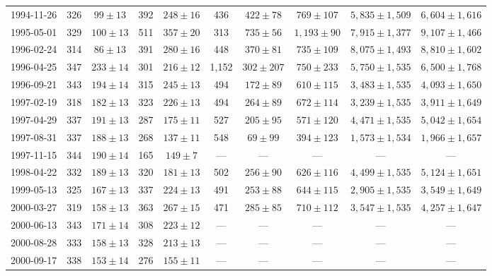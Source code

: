 \begin{landscape}
\begin{longtable}{cccccccccc}
{1994-11-26} & 326 & {$99  \pm  13$} & 392 & {$248 \pm 16$} & 436 & {$422 \pm 78$} & {$769 \pm 107$} & {$5,835 \pm 1,509$} & {$6,604 \pm 1,616$} \\
{1995-05-01} & 329 & {$100  \pm  13$} & 511 & {$357 \pm 20$} & 313 & {$735 \pm 56$} & {$1,193 \pm 90$} & {$7,915 \pm 1,377$} & {$9,107 \pm 1,466$} \\
{1996-02-24} & 314 & {$86  \pm  13$} & 391 & {$280 \pm 16$} & 448 & {$370 \pm 81$} & {$735 \pm 109$} & {$8,075 \pm 1,493$} & {$8,810 \pm 1,602$} \\
{1996-04-25} & 347 & {$233  \pm  14$} & 301 & {$216 \pm 12$} & 1,152 & {$302 \pm 207$} & {$750 \pm 233$} & {$5,750 \pm 1,535$} & {$6,500 \pm 1,768$} \\
{1996-09-21} & 343 & {$194  \pm  14$} & 315 & {$245 \pm 13$} & 494 & {$172 \pm 89$} & {$610 \pm 115$} & {$3,483 \pm 1,535$} & {$4,093 \pm 1,650$} \\
{1997-02-19} & 318 & {$182  \pm  13$} & 323 & {$226 \pm 13$} & 494 & {$264 \pm 89$} & {$672 \pm 114$} & {$3,239 \pm 1,535$} & {$3,911 \pm 1,649$} \\
{1997-04-29} & 337 & {$191  \pm  13$} & 287 & {$175 \pm 11$} & 527 & {$205 \pm 95$} & {$571 \pm 120$} & {$4,471 \pm 1,535$} & {$5,042 \pm 1,654$} \\
{1997-08-31} & 337 & {$188  \pm  13$} & 268 & {$137 \pm 11$} & 548 & {$69 \pm 99$} & {$394 \pm 123$} & {$1,573 \pm 1,534$} & {$1,966 \pm 1,657$} \\
{1997-11-15} & 344 & {$190  \pm  14$} & 165 & {$149 \pm 7$} & --- & --- & --- & --- & --- \\
{1998-04-22} & 332 & {$189  \pm  13$} & 320 & {$181 \pm 13$} & 502 & {$256 \pm 90$} & {$626 \pm 116$} & {$4,499 \pm 1,535$} & {$5,124 \pm 1,651$} \\
{1999-05-13} & 325 & {$167  \pm  13$} & 337 & {$224 \pm 13$} & 491 & {$253 \pm 88$} & {$644 \pm 115$} & {$2,905 \pm 1,535$} & {$3,549 \pm 1,649$} \\
{2000-03-27} & 319 & {$158  \pm  13$} & 363 & {$267 \pm 15$} & 471 & {$285 \pm 85$} & {$710 \pm 112$} & {$3,547 \pm 1,535$} & {$4,257 \pm 1,647$} \\
{2000-06-13} & 343 & {$171  \pm  14$} & 308 & {$223 \pm 12$} & --- & --- & --- & --- & --- \\
{2000-08-28} & 333 & {$158  \pm  13$} & 328 & {$213 \pm 13$} & --- & --- & --- & --- & --- \\
{2000-09-17} & 338 & {$153  \pm  14$} & 276 & {$155 \pm 11$} & --- & --- & --- & --- & --- \\

\end{longtable}
\end{landscape}
